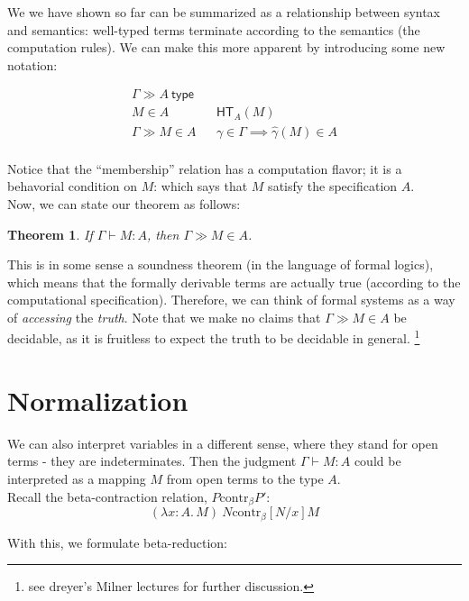 \documentclass{article}
\newtheorem{thm}{Theorem}
\newcommand{\hasEF}[3]{\ensuremath{#1 \vdash #2 : #3}}
\newcommand{\hasTC}[2]{\ensuremath{#1 \gg #2\ \mathsf{type}}}
\newcommand{\hasEC}[3]{\ensuremath{#1 \gg #2 \in #3}}
\newcommand{\hterm}[2]{\ensuremath{\mathsf{HT}_{#1}(#2)}}
\newcommand{\contrb}[2]{#1 \mathrel{\text{contr}_\beta} #2}
\newcommand{\stepb}[2]{\ensuremath{#1 \mapsto_{\beta} #2}}
\newcommand{\ap}[2]{\ensuremath{#1\ #2}}
\newcommand{\lam}[3]{\ensuremath{\lambda #1 {:} #2.\, #3}}
\begin{document}
We we have shown so far can be summarized as a relationship between syntax and semantics: well-typed terms 
terminate according to the semantics (the computation rules). We can make this more apparent by introducing 
some new notation: 

\begin{align}
&\hasTC{\Gamma}{A} && \\
&M \in A && \hterm{A}{M}\\
&\hasEC{\Gamma}{M}{A} && \gamma \in \Gamma \implies \hat\gamma(M) \in A &\\
\end{align}

Notice that the ``membership'' relation has a computation flavor; it is a behavorial condition on $M$: which says 
that $M$ satisfy the specification $A$. \\

Now, we can state our theorem as follows: 

\begin{thm}
If $\hasEF{\Gamma}{M}{A}$, then $\hasEC{\Gamma}{M}{A}$.
\end{thm}

This is in some sense a soundness theorem (in the language of formal logics), which means that the formally derivable
terms are actually true (according to the computational specification). Therefore, we can think of formal systems as a 
way of \emph{accessing} the \emph{truth}. Note that we make no claims that $\hasEC{\Gamma}{M}{A}$ be decidable, 
as it is fruitless to expect the truth to be decidable in general. \footnote{see dreyer's Milner lectures for 
further discussion.}

\section{Normalization}

We can also interpret variables in a different sense, where they stand for open terms - they are indeterminates. 
Then the judgment $\hasEF{\Gamma}{M}{A}$ could be interpreted as a mapping $M$ from open terms to the type $A$.\\

Recall the beta-contraction relation, $\contrb{P}{P'}$:
\[
\contrb{\ap{(\lam{x}{A}{M})}{N}}{[N/x]M}
\]

With this, we formulate beta-reduction: 

\end{document}

